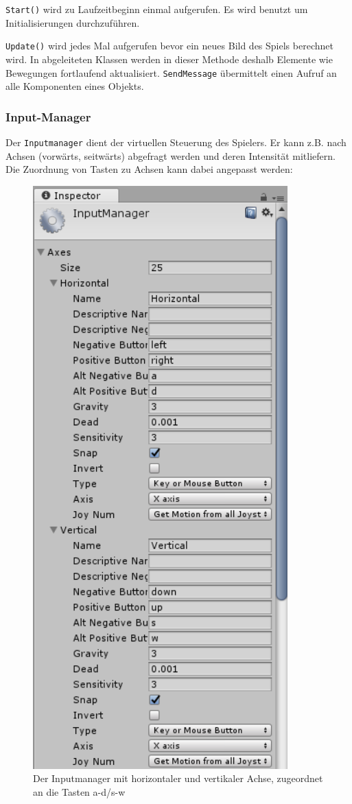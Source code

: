 \lstinline{Start()} wird zu Laufzeitbeginn einmal aufgerufen.
Es wird benutzt um Initialisierungen durchzuführen.

\lstinline{Update()} wird jedes Mal aufgerufen bevor ein neues Bild des Spiels berechnet wird. In abgeleiteten Klassen werden in dieser Methode deshalb Elemente wie Bewegungen fortlaufend aktualisiert.
\lstinline{SendMessage} übermittelt einen Aufruf an alle Komponenten eines Objekts.

\subsubsection{Input-Manager}

Der \lstinline{Inputmanager} dient der virtuellen Steuerung des Spielers. Er kann z.B. nach Achsen (vorwärts, seitwärts) abgefragt werden und deren Intensität mitliefern.
Die Zuordnung von Tasten zu Achsen kann dabei angepasst werden:

\begin{figure}[H]
\includegraphics[scale=0.67]{screenshots/inputaxis.png}
\caption{Der Inputmanager mit horizontaler und vertikaler Achse,  zugeordnet an die Tasten a-d/s-w}
\end{figure}

